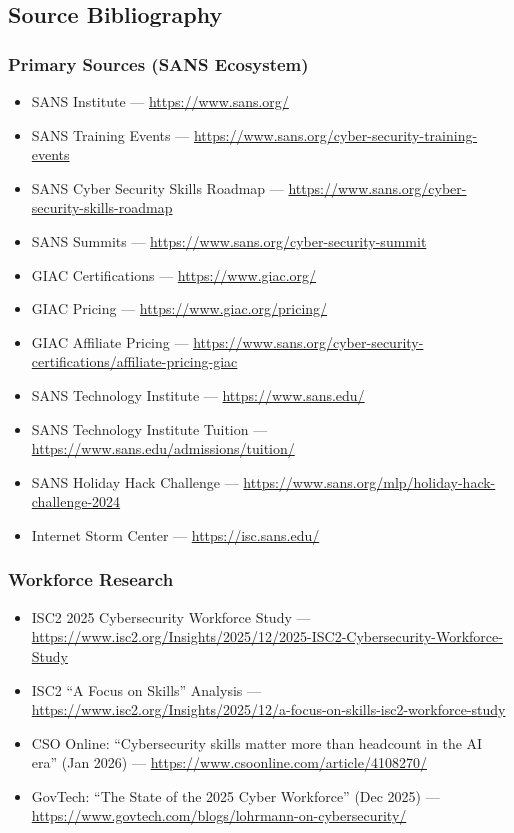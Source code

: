 \documentclass[11pt,letterpaper]{article}
\begin{document}
\subsection{Source Bibliography}

\subsubsection{Primary Sources (SANS Ecosystem)}
\begin{itemize}[nosep]
  \item SANS Institute --- \url{https://www.sans.org/}
  \item SANS Training Events --- \url{https://www.sans.org/cyber-security-training-events}
  \item SANS Cyber Security Skills Roadmap --- \url{https://www.sans.org/cyber-security-skills-roadmap}
  \item SANS Summits --- \url{https://www.sans.org/cyber-security-summit}
  \item GIAC Certifications --- \url{https://www.giac.org/}
  \item GIAC Pricing --- \url{https://www.giac.org/pricing/}
  \item GIAC Affiliate Pricing --- \url{https://www.sans.org/cyber-security-certifications/affiliate-pricing-giac}
  \item SANS Technology Institute --- \url{https://www.sans.edu/}
  \item SANS Technology Institute Tuition --- \url{https://www.sans.edu/admissions/tuition/}
  \item SANS Holiday Hack Challenge --- \url{https://www.sans.org/mlp/holiday-hack-challenge-2024}
  \item Internet Storm Center --- \url{https://isc.sans.edu/}
\end{itemize}

\subsubsection{Workforce Research}
\begin{itemize}[nosep]
  \item ISC2 2025 Cybersecurity Workforce Study --- \url{https://www.isc2.org/Insights/2025/12/2025-ISC2-Cybersecurity-Workforce-Study}
  \item ISC2 ``A Focus on Skills'' Analysis --- \url{https://www.isc2.org/Insights/2025/12/a-focus-on-skills-isc2-workforce-study}
  \item CSO Online: ``Cybersecurity skills matter more than headcount in the AI era'' (Jan 2026) --- \url{https://www.csoonline.com/article/4108270/}
  \item GovTech: ``The State of the 2025 Cyber Workforce'' (Dec 2025) --- \url{https://www.govtech.com/blogs/lohrmann-on-cybersecurity/}
\end{itemize}
\end{document}
